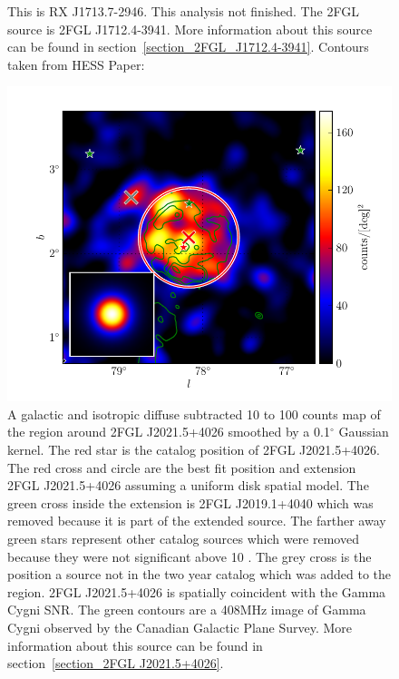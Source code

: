 \documentclass[12pt,preprint]{aastex}
\newcommand{\gev}{\text{GeV}\xspace}
\renewcommand{\deg}{\ensuremath{^\circ}\xspace}
\begin{document}
\begin{figure}
  \begin{center}
  \end{center}
  \caption{
  This is RX J1713.7-2946. This analysis not finished.
  The 2FGL source is 2FGL J1712.4-3941.
  More information about this source can be found in section~\ref{section_2FGL_J1712.4-3941}.
Contours taken from HESS Paper: \cite{rx_j1713_hess}
  }\label{2FGL_J1712.4-3941}
\end{figure}


\begin{figure}
  \begin{center}
    \includegraphics[type=pdf,ext=.pdf,read=.pdf]{source_plots/source_Gamma_Cygni}
  \end{center}
  \caption{A galactic and isotropic diffuse subtracted 10 \gev to 100
  \gev counts map of the region around 2FGL J2021.5+4026 smoothed by a
  0.1\deg Gaussian kernel. The red star is the catalog position of 2FGL
  J2021.5+4026.  The red cross and circle are the best fit position and
  extension 2FGL J2021.5+4026 assuming a uniform disk spatial model.
  The green cross inside the extension is 2FGL J2019.1+4040 which
  was removed because it is part of the extended source.  The farther
  away green stars represent other catalog sources which were removed
  because they were not significant above 10 \gev.  The grey cross is
  the position a source not in the two year catalog which was added
  to the region. 2FGL J2021.5+4026 is spatially coincident with the
  Gamma Cygni SNR.  The green contours are a 408MHz image of Gamma Cygni
  observed by the Canadian Galactic Plane Survey.  More information about
  this source can be found in section~\ref{section_2FGL J2021.5+4026}.
  }\label{1FGL_J2020.0+4049}
\end{figure}
\end{document}
